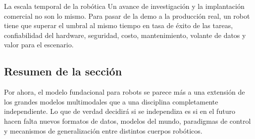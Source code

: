 \begin{importantbox}{La escala temporal de la robótica}
Un avance de investigación y la implantación comercial no son lo mismo. Para pasar de la demo a la producción real, un robot tiene que superar el umbral al mismo tiempo en tasa de éxito de las tareas, confiabilidad del hardware, seguridad, costo, mantenimiento, volante de datos y valor para el escenario.
\end{importantbox}

\subsection{Resumen de la sección}

Por ahora, el modelo fundacional para robots se parece más a una extensión de los grandes modelos multimodales que a una disciplina completamente independiente. Lo que de verdad decidirá si se independiza es si en el futuro hacen falta nuevos formatos de datos, modelos del mundo, paradigmas de control y mecanismos de generalización entre distintos cuerpos robóticos.
